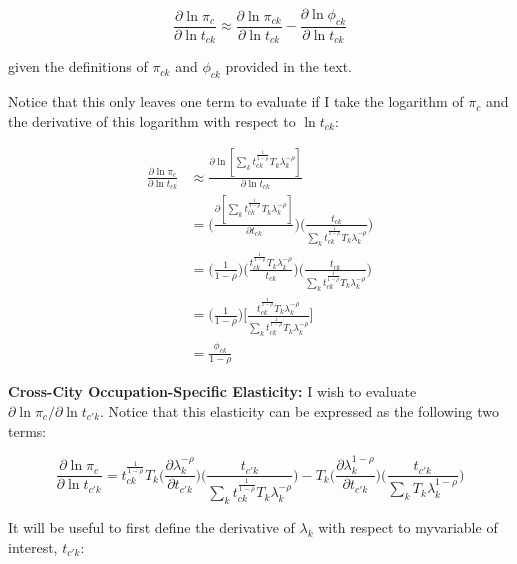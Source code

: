 \documentclass[10pt]{article}
\begin{document}
\begin{equation*}
    \frac{\partial\ln{\pi_{c}}}{\partial\ln{t_{ck}}} \approx \frac{\partial\ln{\pi_{ck}}}{\partial\ln{t_{ck}}} - \frac{\partial\ln{\phi_{ck}}}{\partial\ln{t_{ck}}}
\end{equation*}

given the definitions of $\pi_{ck}$ and $\phi_{ck}$ provided in the text.

Notice that this only leaves one term to evaluate if I take the logarithm of $\pi_{c}$ and the derivative of this logarithm with respect to $\ln{t_{ck}}$:

\begin{align*}
    \frac{\partial\ln{\pi_{c}}}{\partial\ln{t_{ck}}} & \approx \frac{\partial\ln[{\sum\limits_{k}{t^{\frac{1}{1-\rho}}_{ck}}{T_{k}}\lambda_{k}^{-\rho}}]}{\partial\ln{t_{ck}}} \\ &= \Bigg(\frac{\partial[{\sum\limits_{k}{t^{\frac{1}{1-\rho}}_{ck}}{T_{k}}\lambda_{k}^{-\rho}}]}{\partial{t_{ck}}}\Bigg)\Bigg(\frac{t_{ck}}{{\sum\limits_{k}{t^{\frac{1}{1-\rho}}_{ck}}{T_{k}}\lambda_{k}^{-\rho}}}\Bigg)\\ &= \Bigg(\frac{1}{1-\rho}\Bigg)\Bigg(\frac{t_{ck}^{\frac{1}{1-\rho}}{T_{k}}\lambda_{k}^{-\rho}}{t_{ck}}\Bigg)\Bigg(\frac{t_{ck}}{{\sum\limits_{k}{t^{\frac{1}{1-\rho}}_{ck}}{T_{k}}\lambda_{k}^{-\rho}}}\Bigg) \\ &= \Big(\frac{1}{1-\rho}\Big)\Bigg[\frac{{t^{\frac{1}{1-\rho}}_{ck}}{T_{k}}\lambda_{k}^{-\rho}}{\sum\limits_{k}{t^{\frac{1}{1-\rho}}_{ck}}{T_{k}}\lambda_{k}^{-\rho}}\Bigg]\\ &= \frac{\phi_{ck}}{1-\rho}
\end{align*}

\noindent\textbf{Cross-City Occupation-Specific Elasticity:} I wish to evaluate $\partial\ln{\pi_{c}}/\partial\ln{t_{{c'}k}}$. Notice that this elasticity can be expressed as the following two terms:

\begin{equation*}
    \frac{\partial\ln{\pi_{c}}}{\partial\ln{t_{{c'}k}}} = {t^{\frac{1}{1-\rho}}_{ck}}{T_{k}}\Big(\frac{\partial\lambda_{k}^{-\rho}}{\partial{t_{{c'}k}}}\Big)\Big(\frac{t_{{c'}k}}{{\sum\limits_{k}{t^{\frac{1}{1-\rho}}_{ck}}{T_{k}}\lambda_{k}^{-\rho}}}\Big) - {T_{k}}\Big(\frac{\partial\lambda_{k}^{1-\rho}}{\partial{t_{{c'}k}}}\Big)\Big(\frac{t_{{c'}k}}{{\sum\limits_{k}{T_{k}}\lambda_{k}^{1-\rho}}}\Big)
\end{equation*}

It will be useful to first define the derivative of $\lambda_{k}$ with respect to myvariable of interest, $t_{{c'}k}$:
\end{document}

